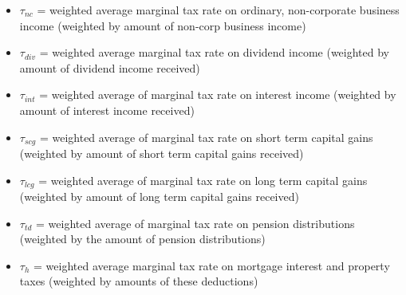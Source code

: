 \documentclass[article,11pt,letterpaper,fleqn]{article}
\theoremstyle{definition}
\numberwithin{equation}{section}
\begin{document}
\begin{itemize}
\item $\tau_{nc}$ = weighted average marginal tax rate on ordinary, non-corporate business income (weighted by amount of non-corp business income)
\item $\tau_{div}$ = weighted average marginal tax rate on dividend income (weighted by amount of dividend income received)
\item $\tau_{int}$ = weighted average of marginal tax rate on interest income (weighted by amount of interest income received)
\item $\tau_{scg}$ = weighted average of marginal tax rate on short term capital gains (weighted by amount of short term capital gains received)
\item $\tau_{lcg}$ = weighted average of marginal tax rate on long term capital gains (weighted by amount of long term capital gains received)
\item $\tau_{td}$ = weighted average of marginal tax rate on pension distributions (weighted by the amount of pension distributions)
\item $\tau_{h}$ = weighted average marginal tax rate on mortgage interest and property taxes (weighted by amounts of these deductions)
\end{itemize}


%


\end{document}
